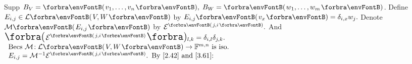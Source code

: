 \BulletPointX\NoteFor{[3.60]}\;\;Supp $B_V=\Par{v_1,\dots,v_n},\;B_W=\Par{w_1,\dots,w_m}$.\TextB{\vspace{2pt}}
{Define $E_{i,j}\in\Lm{V,W}$ by $E_{i,j}\Par{v_x}=\delta_{i,x} w_j.$ Denote $\Mt{E_{i,j}}$ by $\mEnt{j,i}.$ And $\BigPar{\mEnt{j,i}}{_{l,k}}=\delta_{i,l}\delta_{j,k}.$}\vspace{4pt}\TextB{}
\TextB{\vspace{-14pt}}
\hspace{-5pt}$\hText{$
Becs $\mM\!:\Lm{V,W}\rightarrow\Fbb^{m,n}$ is iso.$\\$
$E_{i,j}=\Mneg\mEnt{j,i}.$ \,By [2.42] and [3.61]:$\\[2pt]\,}$\quad

